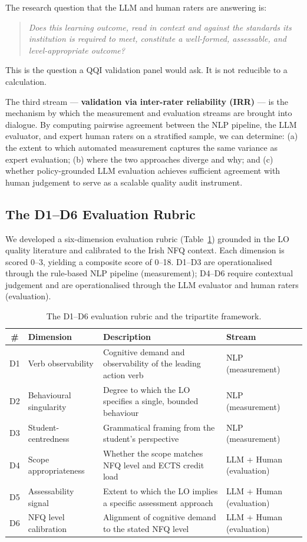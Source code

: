 \documentclass[12pt, a4paper]{article}
\begin{document}
The research question that the LLM and human raters are answering is:

\begin{quote}
\textit{Does this learning outcome, read in context and against the standards its
institution is required to meet, constitute a well-formed, assessable, and
level-appropriate outcome?}
\end{quote}

This is the question a QQI validation panel would ask. It is not reducible to a
calculation.

The third stream --- \textbf{validation via inter-rater reliability (IRR)} --- is the
mechanism by which the measurement and evaluation streams are brought into dialogue.
By computing pairwise agreement between the NLP pipeline, the LLM evaluator, and
expert human raters on a stratified sample, we can determine: (a) the extent to which
automated measurement captures the same variance as expert evaluation; (b) where the
two approaches diverge and why; and (c) whether policy-grounded LLM evaluation achieves
sufficient agreement with human judgement to serve as a scalable quality audit instrument.

\subsection{The D1--D6 Evaluation Rubric}

We developed a six-dimension evaluation rubric (Table~\ref{tab:rubric}) grounded in
the LO quality literature and calibrated to the Irish NFQ context. Each dimension is
scored 0--3, yielding a composite score of 0--18. D1--D3 are operationalised through
the rule-based NLP pipeline (measurement); D4--D6 require contextual judgement and
are operationalised through the LLM evaluator and human raters (evaluation).

\begin{table}[H]
\centering
\caption{The D1--D6 evaluation rubric and the tripartite framework.}
\label{tab:rubric}
\begin{tabularx}{\textwidth}{clXl}
\toprule
\textbf{\#} & \textbf{Dimension} & \textbf{Description} & \textbf{Stream} \\
\midrule
D1 & Verb observability     & Cognitive demand and observability of the leading action verb & NLP (measurement) \\
D2 & Behavioural singularity & Degree to which the LO specifies a single, bounded behaviour & NLP (measurement) \\
D3 & Student-centredness    & Grammatical framing from the student's perspective           & NLP (measurement) \\
D4 & Scope appropriateness  & Whether the scope matches NFQ level and ECTS credit load     & LLM + Human (evaluation) \\
D5 & Assessability signal   & Extent to which the LO implies a specific assessment approach & LLM + Human (evaluation) \\
D6 & NFQ level calibration  & Alignment of cognitive demand to the stated NFQ level        & LLM + Human (evaluation) \\
\bottomrule
\end{tabularx}
\end{table}
\end{document}
